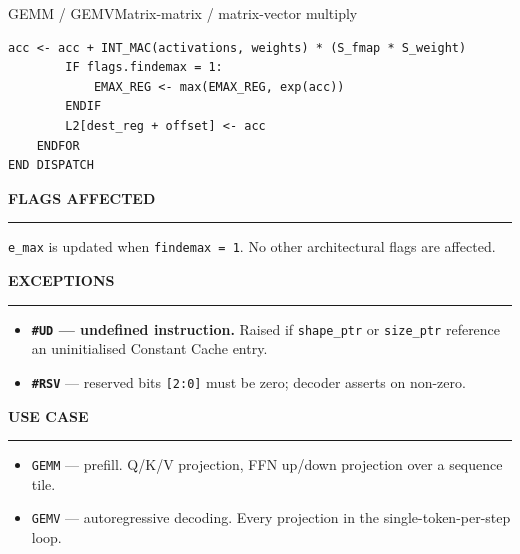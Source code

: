\documentclass[11pt,a4paper,twoside,openany]{report}
\newcommand{\RefSection}[1]{%
  \par\medskip
  {\sffamily\bfseries\color{oceanblue}\normalsize\MakeUppercase{#1}}
  \par\vspace{-0.4em}
  {\color{oceanblue}\rule{\linewidth}{0.4pt}}\par\smallskip
}
\begin{document}
\begin{InstructionRef}{GEMM / GEMV}{Matrix-matrix / matrix-vector multiply}
\begin{lstlisting}[style=pseudo]
        acc <- acc + INT_MAC(activations, weights) * (S_fmap * S_weight)
        IF flags.findemax = 1:
            EMAX_REG <- max(EMAX_REG, exp(acc))
        ENDIF
        L2[dest_reg + offset] <- acc
    ENDFOR
END DISPATCH
\end{lstlisting}

\RefSection{Flags affected}

\texttt{e\_max} is updated when \texttt{findemax = 1}. No other
architectural flags are affected.

\RefSection{Exceptions}

\begin{itemize}[leftmargin=*, itemsep=0.2ex]
  \item \textbf{\texttt{\#UD} --- undefined instruction.} Raised if
        \texttt{shape\_ptr} or \texttt{size\_ptr} reference an
        uninitialised Constant Cache entry.
  \item \textbf{\texttt{\#RSV}} --- reserved bits \texttt{[2:0]}
        must be zero; decoder asserts on non-zero.
\end{itemize}

\RefSection{Use case}

\begin{itemize}[leftmargin=*, itemsep=0.2ex]
  \item \texttt{GEMM} --- prefill. Q/K/V projection, FFN up/down
        projection over a sequence tile.
  \item \texttt{GEMV} --- autoregressive decoding. Every projection
        in the single-token-per-step loop.
\end{itemize}
\end{InstructionRef}
\end{document}
